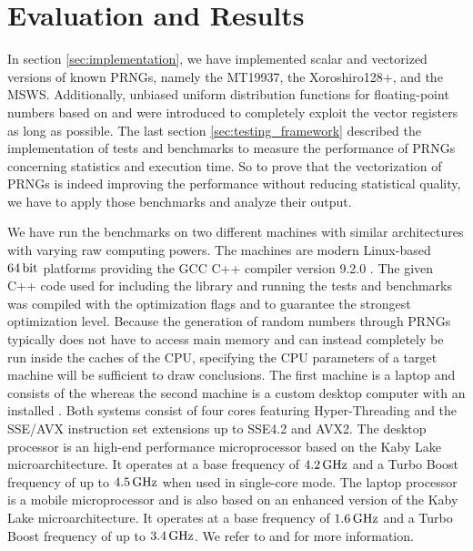 \documentclass{stdlocal}
\begin{document}
\section{Evaluation and Results} %
\label{sec:evaluation}
  In section \ref{sec:implementation}, we have implemented scalar and vectorized versions of known PRNGs, namely the MT19937, the Xoroshiro128+, and the MSWS.
  Additionally, unbiased uniform distribution functions for floating-point numbers based on \textcite[\ppno~55-56]{kneusel2018} and \textcite{vigna-xoroshiro} were introduced to completely exploit the vector registers as long as possible.
  The last section \ref{sec:testing_framework} described the implementation of tests and benchmarks to measure the performance of PRNGs concerning statistics and execution time.
  So to prove that the vectorization of PRNGs is indeed improving the performance without reducing statistical quality, we have to apply those benchmarks and analyze their output.

  We have run the benchmarks on two different machines with similar architectures with varying raw computing powers.
  The machines are modern Linux-based $64\, \mathrm{bit}$ platforms providing the GCC C++ compiler version 9.2.0 \autocite{gcc}.
  The given C++ code used for including the library and running the tests and benchmarks was compiled with the optimization flags  and  to guarantee the strongest optimization level.
  Because the generation of random numbers through PRNGs typically does not have to access main memory and can instead completely be run inside the caches of the CPU, specifying the CPU parameters of a target machine will be sufficient to draw conclusions.
  The first machine is a laptop and consists of the  \autocite{intel-kaby-lake-i5} whereas the second machine is a custom desktop computer with an installed  \autocite{intel-kaby-lake-i7}.
  Both systems consist of four cores featuring Hyper-Threading and the SSE/AVX instruction set extensions up to SSE4.2 and AVX2.
  The desktop processor is an high-end performance microprocessor based on the Kaby Lake microarchitecture.
  It operates at a base frequency of $4.2\, \mathrm{GHz}$ and a Turbo Boost frequency of up to $4.5\, \mathrm{GHz}$ when used in single-core mode.
  The laptop processor is a mobile microprocessor and is also based on an enhanced version of the Kaby Lake microarchitecture.
  It operates at a base frequency of $1.6\, \mathrm{GHz}$ and a Turbo Boost frequency of up to $3.4\, \mathrm{GHz}$.
  We refer to \textcite{intel-kaby-lake-i5} and \textcite{intel-kaby-lake-i7} for more information.
\end{document}
